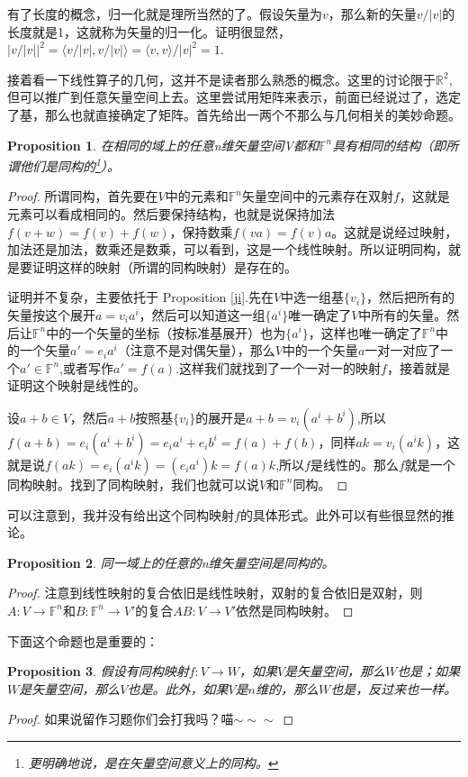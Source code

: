 \documentclass[11pt,a4paper,openany]{book}%
\theoremstyle{plain}%
\newtheorem{pro}{Proposition}[chapter]%
\begin{document}
有了长度的概念，归一化就是理所当然的了。假设矢量为$v$，那么新的矢量$v/|v|$的长度就是1，这就称为矢量的归一化。证明很显然，$|v/|v||^2=\langle v/|v|,v/|v|\rangle=\langle v,v\rangle/|v|^2=1$.

接着看一下线性算子的几何，这并不是读者那么熟悉的概念。这里的讨论限于$\mathbb{R}^{2}$,但可以推广到任意矢量空间上去。这里尝试用矩阵来表示，前面已经说过了，选定了基，那么也就直接确定了矩阵。首先给出一两个不那么与几何相关的美妙命题。
\begin{pro}
\label{空间同构}
在相同的域上的任意n维矢量空间V都和$\mathbb{F}^{n}$具有相同的结构（即所谓他们是同构的\footnote{更明确地说，是在矢量空间意义上的同构。}）。
\end{pro}
\begin{proof}
所谓同构，首先要在$V$中的元素和$\mathbb{F}^{n}$矢量空间中的元素存在双射$f$，这就是元素可以看成相同的。然后要保持结构，也就是说保持加法$f(v+w)=f(v)+f(w)$，保持数乘$f(va)=f(v)a$。这就是说经过映射，加法还是加法，数乘还是数乘，可以看到，这是一个线性映射。所以证明同构，就是要证明这样的映射（所谓的同构映射）是存在的。

证明并不复杂，主要依托于 Proposition \ref{ji}.先在$V$中选一组基$\{v_i\}$，然后把所有的矢量按这个展开$a=v_ia^i$，然后可以知道这一组$\{a^i\}$唯一确定了$V$中所有的矢量。然后让$\mathbb{F}^{n}$中的一个矢量的坐标（按标准基展开）也为$\{a^i\}$，这样也唯一确定了$\mathbb{F}^{n}$中的一个矢量$a'=e_ia^i$（注意不是对偶矢量），那么$V$中的一个矢量$a$一对一对应了一个$a' \in \mathbb{F}^{n}$,或者写作$a'=f(a)$.这样我们就找到了一个一对一的映射$f$，接着就是证明这个映射是线性的。

设$a+b \in V$，然后$a+b$按照基$\{v_i\}$的展开是$a+b=v_i(a^i+b^i)$,所以$f(a+b)=e_i(a^i+b^i)=e_ia^i+e_ib^i=f(a)+f(b)$，同样$ak=v_i(a^ik)$，这就是说$f(ak)=e_i(a^ik)=(e_ia^i)k=f(a)k$,所以$f$是线性的。那么$f$就是一个同构映射。找到了同构映射，我们也就可以说$V$和$\mathbb{F}^{n}$同构。
\end{proof}

可以注意到，我并没有给出这个同构映射$f$的具体形式。此外可以有些很显然的推论。
\begin{pro}
同一域上的任意的n维矢量空间是同构的。
\end{pro}
\begin{proof}
注意到线性映射的复合依旧是线性映射，双射的复合依旧是双射，则$A:V\rightarrow \mathbb{F}^{n}$和$B:\mathbb{F}^{n}\rightarrow V'$的复合$AB:V\rightarrow V'$依然是同构映射。
\end{proof}

下面这个命题也是重要的：
\begin{pro}
\label{同构传递空间结构}
假设有同构映射$f:V\rightarrow W$，如果$V$是矢量空间，那么$W$也是；如果$W$是矢量空间，那么$V$也是。此外，如果$V$是$n$维的，那么$W$也是，反过来也一样。
\end{pro}
\begin{proof}
如果说留作习题你们会打我吗？喵$\sim \sim \sim$
\end{proof}
\end{document}
